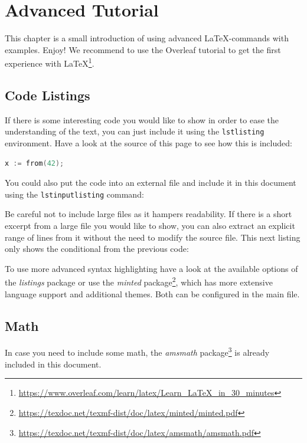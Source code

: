 \chapter{Advanced Tutorial}
This chapter is a small introduction of using advanced \LaTeX-commands with examples. Enjoy! We recommend to use the Overleaf tutorial to get the first experience with \LaTeX\footnote{\url{https://www.overleaf.com/learn/latex/Learn_LaTeX_in_30_minutes}}. 
\newpage
\section{Code Listings}
If there is some interesting code you would like to show
in order to ease the understanding of the text,
you can just include it using the \verb+lstlisting+ environment.
Have a look at the source of this page to see how this is included:

\begin{lstlisting}[language=Go]
x := from(42);
\end{lstlisting}

You could also put the code into an external file
and include it in this document using the \verb+lstinputlisting+ command:



Be careful not to include large files as it hampers readability.
If there is a short excerpt from a large file you would like to show,
you can also extract an explicit range of lines from it without the need to modify the source file.
This next listing only shows the conditional from the previous code:



To use more advanced syntax highlighting
have a look at the available options of the \emph{listings} package
or use the \emph{minted} package\footnote{\url{https://texdoc.net/texmf-dist/doc/latex/minted/minted.pdf}},
which has more extensive language support and additional themes.
Both can be configured in the main file.
\newpage
\section{Math}
In case you need to include some math,
the \emph{amsmath} package\footnote{\url{https://texdoc.net/texmf-dist/doc/latex/amsmath/amsmath.pdf}} is already included in this document.

